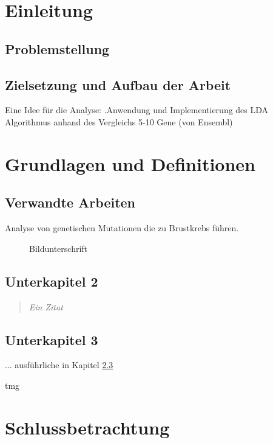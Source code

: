 




		

		
\chapter{Einleitung}
	
\section{Problemstellung}
	
		
	\section{Zielsetzung und Aufbau der Arbeit}
		 
Eine Idee für die Analyse:
.Anwendung und Implementierung des LDA Algorithmus anhand des Vergleichs 5-10 Gene (von Ensembl) 
		
\chapter{Grundlagen und Definitionen}
	
	
	\section{Verwandte Arbeiten}
	Analyse von genetischen Mutationen die zu Brustkrebs führen.	
	\cite{breastcancer}
	
		\begin{figure}[htbp]
			\centering
			\caption[xxx]{Bildunterschrift}
			\label{xxx}
		\end{figure}
		
			
	\section{Unterkapitel 2}
		
		\begin{quote}
			\textit{Ein Zitat}
		\end{quote}

	\section{Unterkapitel 3}	\label{Kapitel_xxx} %
		... ausführliche in Kapitel \ref{Kapitel_xxx}

				\autocite[20]{}
				
	\gls{tmg}

\chapter{Schlussbetrachtung}


\newpage






